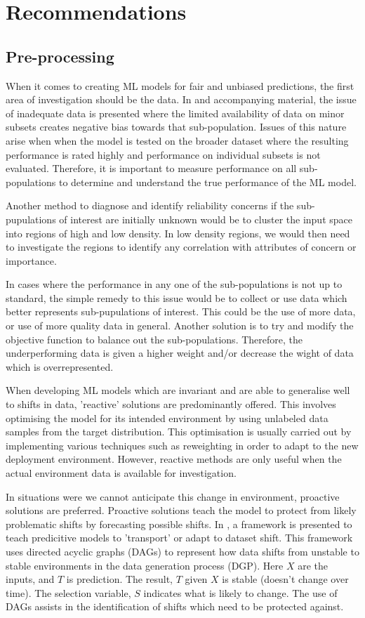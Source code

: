 \pagebreak
\section{Recommendations}
\subsection{Pre-processing} 
When it comes to creating ML models for fair and unbiased predictions, the first area of investigation should be the data.
In \cite{saria2019tutorial} and accompanying material, the issue of inadequate data is presented where the limited availability of data on minor subsets creates negative bias towards that sub-population.
Issues of this nature arise when when the model is tested on the broader dataset where the resulting performance is rated highly and performance on individual subsets is not evaluated.
Therefore, it is important to measure performance on all sub-populations to determine and understand the true performance of the ML model.

Another method to diagnose and identify reliability concerns if the sub-pupulations of interest are initially unknown 
would be to cluster the input space into regions of high and low density.
In low density regions, we would then need to investigate the regions to identify any correlation with attributes of concern or importance.

In cases where the performance in any one of the sub-populations is not up to standard, the simple remedy to this issue would be to collect or use data which better represents sub-pupulations of interest.
This could be the use of more data, or use of more quality data in general.
Another solution is to try and modify the objective function to balance out the sub-populations. 
Therefore, the underperforming data is given a higher weight and/or decrease the wight of data which is overrepresented. 

When developing ML models which are invariant and are able to generalise well to shifts in data, 'reactive' solutions are predominantly offered.
This involves optimising the model for its intended environment by using unlabeled data samples from the target distribution.
This optimisation is usually carried out by implementing various techniques such as reweighting in order to adapt to the new deployment environment.
However, reactive methods are only useful when the actual environment data is available for investigation. 

In situations were we cannot anticipate this change in environment, proactive solutions are preferred.
Proactive solutions teach the model to protect from likely problematic shifts by forecasting possible shifts.
In \cite{subbaswamy2019preventing}, a framework is presented to teach predicitive models to 'transport' or adapt to dataset shift.
This framework uses directed acyclic graphs (DAGs) to represent how data shifts from unstable to stable environments in the data generation process (DGP).
Here $X$ are the inputs, and $T$ is prediction. The result, $T$ given $X$ is stable (doesn't change over time).
The selection variable, $S$ indicates what is likely to change. The use of DAGs assists in the identification of shifts which need to be protected against.

